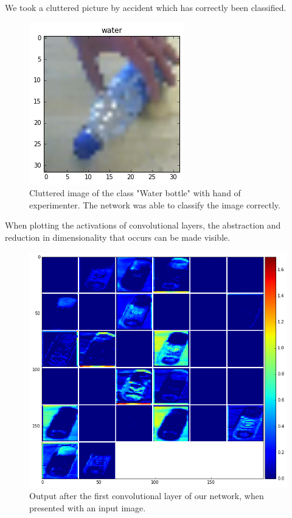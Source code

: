\documentclass[	DIV=calc,%
				paper=a4,%
				fontsize=11pt,%
				twocolumn]{scrartcl}	 %
\begin{document}
We took a cluttered picture by accident which has correctly been classified.

\begin{figure}[H]
    \centering
    \includegraphics[width=0.5\linewidth]{data/cluttered_image}
    \caption{Cluttered image of the class "Water bottle" with hand of experimenter. The network was able to classify the image correctly.}
\end{figure}

When plotting the activations of convolutional layers, the abstraction and reduction in dimensionality that occurs can be made visible.

\begin{figure}[H]
    \centering
    \includegraphics[width=0.8\linewidth]{data/final_cnn_firstlayer}
    \caption{Output after the first convolutional layer of our network, when presented with an input image.}
\end{figure}
\end{document}

